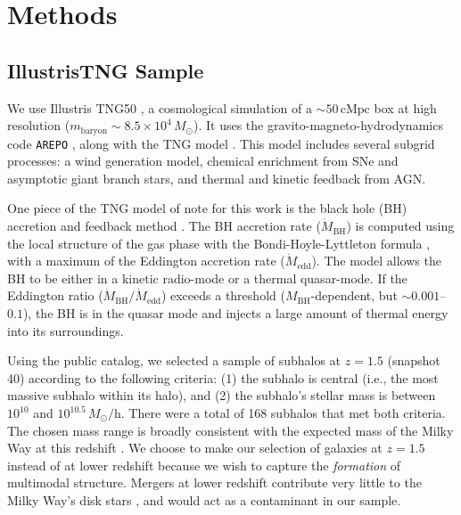 \documentclass[twocolumn]{aastex631}
\newcommand{\Msun}{\ensuremath{M_{\odot}}}
\newcommand{\alphaFe}{\ensuremath{[\alpha/\textrm{Fe}]}}
\begin{document}

\section{Methods}\label{sec:methods}
\subsection{IllustrisTNG Sample}\label{ssec:tng}
We use Illustris TNG50 \citep{2019MNRAS.490.3196P, 2019MNRAS.490.3234N}, a cosmological simulation of a $\sim50\,\textrm{cMpc}$ box at high resolution ($m_{\textrm{baryon}}\sim8.5\times10^4\,\Msun$). It uses the gravito-magneto-hydrodynamics code \texttt{AREPO} \citep{2010MNRAS.401..791S, 2016MNRAS.455.1134P}, along with the TNG model \citep{2013MNRAS.436.3031V, 2017MNRAS.465.3291W, 2018MNRAS.473.4077P}. This model includes several subgrid processes: a wind generation model, chemical enrichment from SNe and asymptotic giant branch stars, and thermal and kinetic feedback from AGN.

One piece of the TNG model of note for this work is the black hole (BH) accretion and feedback method \citep{2017MNRAS.465.3291W}. The BH accretion rate ($\dot{M}_{\textrm{BH}}$) is computed using the local structure of the gas phase with the Bondi-Hoyle-Lyttleton formula \citep{1939PCPS...35..405H,1944MNRAS.104..273B,1952MNRAS.112..195B}, with a maximum of the Eddington accretion rate ($\dot{M}_{\textrm{edd}}$). The model allows the BH to be either in a kinetic radio-mode or a thermal quasar-mode. If the Eddington ratio ($\dot{M}_{\textrm{BH}}/\dot{M}_{\textrm{edd}}$) exceeds a threshold ($M_{\textrm{BH}}$-dependent, but $\sim0.001$--$0.1$), the BH is in the quasar mode and injects a large amount of thermal energy into its surroundings.

Using the public catalog, we selected a sample of subhalos at $z=1.5$ (snapshot 40) according to the following criteria: (1) the subhalo is central (i.e., the most massive subhalo within its halo), and (2) the subhalo's stellar mass is between $10^{10}$ and $10^{10.5}\,\Msun/\textrm{h}$. There were a total of 168 subhalos that met both criteria. The chosen mass range is broadly consistent with the expected mass of the Milky Way at this redshift \citep{2013ApJ...771L..35V}. We choose to make our selection of galaxies at $z=1.5$ instead of at lower redshift because we wish to capture the \textit{formation} of multimodal structure. Mergers at lower redshift contribute very little to the Milky Way's disk stars \citep[e.g.,][]{2016ARA&A..54..529B}, and would act as a contaminant in our sample.
\end{document}
